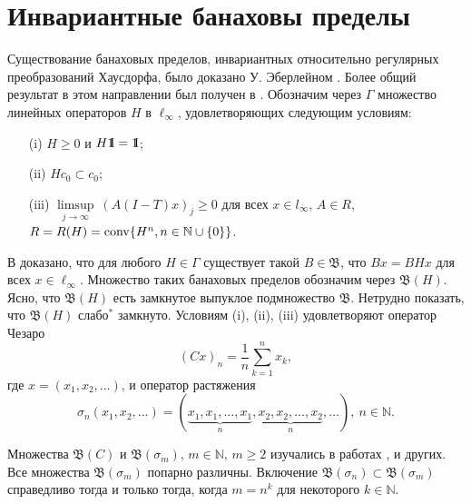 \documentclass[12pt]{article}
\newcommand{\emm}{\mathrm{1\hspace{-0.3em} I}}
\newtheorem{prop}[thm]{Утверждение}
\def\N{{\mathbb{N}}}
\def\B{{\mathfrak{B}}}
\begin{document}
\section{Инвариантные банаховы пределы}\label{sec:inv}

Существование банаховых пределов, инвариантных относительно регулярных преобразований Хаусдорфа, было доказано У. Эберлейном \cite{Eberlein}. Более общий результат в этом направлении был получен в \cite{SS_JFA}.
Обозначим через $\Gamma$ множество линейных операторов $H$ в $\ell_\infty$, удовлетворяющих следующим условиям:
\begin{enumerate}
\item[(i)]
$H\geq0$ и $H\emm=\emm$;

\item[(ii)]
$Hc_0\subset c_0$;

\item[(iii)]
$\limsup\limits_{j\to\infty} \ (A(I-T)x)_j\geq0$ для всех $x\in
l_\infty$, $A\in
R$, $R=R(H)={\rm conv} \{H^n,n\in\mathbb N\cup\{0\}\}$.
\end{enumerate}

В \cite{SS_JFA} доказано, что для любого $H\in \Gamma$ существует такой $B\in\B$, что  $Bx=BHx$ для всех $x\in \ell_\infty$. Множество таких банаховых пределов обозначим через $\B(H)$. Ясно, что $\B(H)$ есть замкнутое выпуклое подмножество $\B$. Нетрудно показать, что $\B(H)$ слабо$^*$ замкнуто. Условиям (i), (ii), (iii) удовлетворяют оператор Чезаро
\begin{equation}\label{cesaro}
(Cx)_n=\frac1n\sum_{k=1}^n x_k,
\end{equation}
где $x=(x_1, x_2, \dots)$,
и оператор растяжения
$$\sigma_n(x_1, x_2, \dots)=(\underbrace{x_1, x_1, \dots, x_1}_{n}, \underbrace{x_2, x_2, \dots, x_2}_{n}, \dots), \ n\in\N.$$

Множества $\B(C)$ и $\mathfrak B(\sigma_m)$, $m\in \N$, $m\ge 2$ изучались в работах \cite{SS_JFA}, \cite{ASSU2} и других. Все множества $\mathfrak B(\sigma_m)$ попарно различны. Включение $\mathfrak B(\sigma_n) \subset \mathfrak B(\sigma_m)$ справедливо тогда и только тогда, когда $m=n^k$ для некоторого $k\in \N$.


%
%
%
\end{document}
